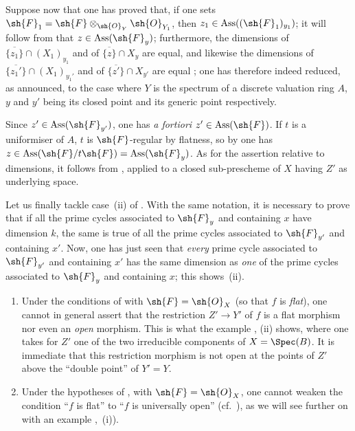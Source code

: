 \begin{env}[12.1.1.4]
Suppose now that one has proved that, if one sets $\sh{F}_1=\sh{F}\otimes_{\sh{O}_Y}\sh{O}_{Y_1}$, then $z_1\in\operatorname{Ass}((\sh{F}_1)_{y_1})$; it will follow from  that $z\in\operatorname{Ass}(\sh{F}_y)$; furthermore, the dimensions of $\overline{\{z_1\}}\cap(X_1)_{y_1}$ and of $\overline{\{z\}}\cap X_y$ are equal, and likewise the dimensions of $\overline{\{z_1'\}}\cap(X_1)_{y_1'}$ and of $\overline{\{z'\}}\cap X_{y'}$ are equal ; one has therefore indeed reduced, as announced, to the case where $Y$ is the spectrum of a discrete valuation ring $A$, $y$ and $y'$ being its closed point and its generic point respectively.

Since $z'\in\operatorname{Ass}(\sh{F}_{y'})$, one has \emph{a fortiori} $z'\in\operatorname{Ass}(\sh{F})$.
If $t$ is a uniformiser of $A$, $t$ is $\sh{F}$-regular by flatness, so by  one has $z\in\operatorname{Ass}(\sh{F}/t\sh{F})=\operatorname{Ass}(\sh{F}_y)$.
As for the assertion relative to dimensions, it follows from , applied to a closed sub-prescheme of $X$ having $Z'$ as underlying space.

Let us finally tackle case~(ii) of .
With the same notation, it is necessary to prove that if all the prime cycles associated to $\sh{F}_y$ and containing $x$ have dimension $k$, the same is true of all the prime cycles associated to $\sh{F}_{y'}$ and containing $x'$.
Now, one has just seen that \emph{every} prime cycle associated to $\sh{F}_{y'}$ and containing $x'$ has the same dimension as \emph{one} of the prime cycles associated to $\sh{F}_y$ and containing $x$; this shows~(ii).
\end{env}

\begin{remarks}[12.1.2]
\label{IV.12.1.2}
\begin{enumerate}[label=(\roman*)]
  \item Under the conditions of  with $\sh{F}=\sh{O}_X$ (so that $f$ is \emph{flat}), one cannot in general assert that the restriction $Z'\to Y'$ of $f$ is a flat morphism nor even an \emph{open} morphism.
This is what the example ,
(ii) shows, where one takes for $Z'$ one of the two irreducible components of $X=\Spec(B)$.
It is immediate that this restriction morphism is not open at the points of $Z'$ above the ``double point'' of $Y'=Y$.

  \item Under the hypotheses of , with $\sh{F}=\sh{O}_X$, one cannot weaken the condition ``$f$ is flat'' to ``$f$ is universally open'' (cf.\ ), as we will see further on with an example ,~(i)).
\end{enumerate}
\end{remarks}

